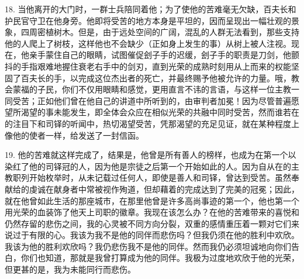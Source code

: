 18. 当他离开的大门时，一群士兵陪同着他；为了使他的苦难毫无欠缺，百夫长和护民官守卫在他身旁。他即将受苦的地方本身是平坦的，因而呈现出一幅壮观的景象，四周密植树木。但是，由于远处空间的广阔，混乱的人群无法看到，那些支持他的人爬上了树枝，这样他也不会缺少（正如身上发生的事）从树上被人注视。现在，他亲手蒙住自己的眼睛，试图催促刽子手的迟缓，刽子手的职责是刀剑，他颤抖的手指艰难地握住衰老右手中的剑刃，直到光荣的成熟时刻用从上而来的权能坚固了百夫长的手，以完成这位杰出者的死亡，并最终赐予他被允许的力量。哦，教会蒙福的子民，你们不仅用眼睛和感觉，更用直言不讳的言语，与这样一位主教一同受苦；正如他们曾在他自己的讲道中所听到的，由审判者加冕！因为尽管普遍愿望所渴望的事未能发生，即全体会众应在相似光荣的共融中同时受苦，然而谁若在的注目下和司铎的听闻中，热切渴望受苦，凭那渴望的充足见证，就在某种程度上像他的使者一样，给发送了一封信函。\par

19. 他的苦难就这样完成了，结果是，他曾是所有善人的榜样，也成为在第一个以染红了他的司铎冠的人，因为他是宗徒之后第一个开始如此的人。因为自从在的主教职列开始枚举时，从未记载过任何人，即使是善人和司铎，曾达到受苦。虽然奉献给的虔诚在献身者中常被视作殉道，但却藉着的完成达到了完美的冠冕；因此，就在他曾如此生活的那座城市，在那里他曾是许多高尚事迹的第一个，他也第一个用光荣的血装饰了他天上司职的徽章。我现在该怎么办？在他的苦难带来的喜悦和仍然存留的悲伤之间，我的心灵被不同方向分裂，双重的感情重压着一颗对它们来说过于有限的心。我该为我不是他的同伴而悲伤吗？但我仍须在他的胜利中欢欣。我该为他的胜利欢欣吗？我仍悲伤我不是他的同伴。然而我仍必须坦诚地向你们告白，你们也知道，那就是我曾打算成为他的同伴。我极为过度地欢欣于他的光荣，但更甚的是，我为未能同行而悲伤。\par

